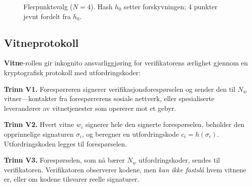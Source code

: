 \documentclass[11pt,a4paper,twocolumn]{article}
\begin{document}
\begin{figure}[ht]
\centering
{}
\caption{Flerpunktsvalg ($N{=}4$). Hash $h_0$ setter forskyvningen; 4 punkter jevnt fordelt fra $h_0$.}
\label{fig:multipoint}
\end{figure}

\subsection{Vitneprotokoll}

\textbf{Vitne}-rollen gir inkognito ansvarliggjøring for verifikatorens ærlighet gjennom en kryptografisk protokoll med utfordringskoder:

\textbf{Trinn V1.} Forespørreren signerer verifikasjonsforespørselen og sender den til $N_w$ vitner---kontakter fra forespørrerens sosiale nettverk, eller spesialiserte leverandører av vitnetjenester som opererer mot et gebyr.

\textbf{Trinn V2.} Hvert vitne $w_i$ signerer hele den signerte forespørselen, beholder den opprinnelige signaturen $\sigma_i$, og beregner en utfordringskode $c_i = h(\sigma_i)$. Utfordringskoden legges til forespørselen.

\textbf{Trinn V3.} Forespørselen, som nå bærer $N_w$ utfordringskoder, sendes til verifikatoren. Verifikatoren observerer kodene, men \emph{kan ikke fastslå} hvem vitnene er, eller om kodene tilsvarer reelle signaturer.
\end{document}

